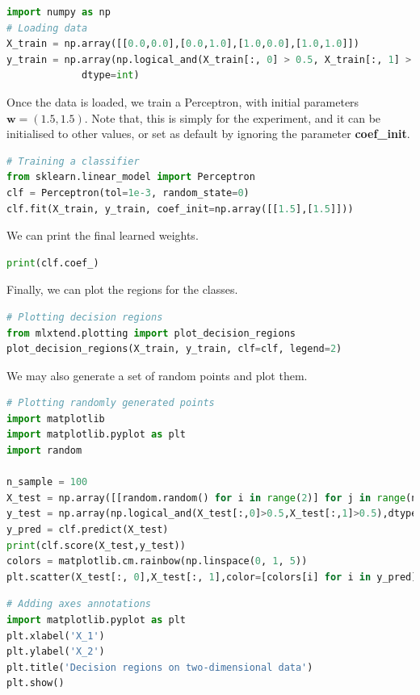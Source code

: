 \begin{lstlisting}[language=Python]
import numpy as np
# Loading data
X_train = np.array([[0.0,0.0],[0.0,1.0],[1.0,0.0],[1.0,1.0]])
y_train = np.array(np.logical_and(X_train[:, 0] > 0.5, X_train[:, 1] > 0.5), 
             dtype=int)
\end{lstlisting}

Once the data is loaded, we train a Perceptron, with initial parameters $\textbf{w}=(1.5,1.5)$. Note that, this is simply for the experiment, and it can be initialised to other values, or set as default by ignoring the parameter \textbf{coef\_init}. 

\begin{lstlisting}[language=Python]
# Training a classifier
from sklearn.linear_model import Perceptron
clf = Perceptron(tol=1e-3, random_state=0)
clf.fit(X_train, y_train, coef_init=np.array([[1.5],[1.5]]))
\end{lstlisting}

We can print the final learned weights. 

\begin{lstlisting}[language=Python]
print(clf.coef_)
\end{lstlisting}

Finally, we can plot the regions for the classes. 

\begin{lstlisting}[language=Python]
# Plotting decision regions
from mlxtend.plotting import plot_decision_regions
plot_decision_regions(X_train, y_train, clf=clf, legend=2)
\end{lstlisting}

We may also generate a set of random points and plot them. 

\begin{lstlisting}[language=Python]
# Plotting randomly generated points 
import matplotlib
import matplotlib.pyplot as plt
import random

n_sample = 100
X_test = np.array([[random.random() for i in range(2)] for j in range(n_sample)])
y_test = np.array(np.logical_and(X_test[:,0]>0.5,X_test[:,1]>0.5),dtype=int)
y_pred = clf.predict(X_test) 
print(clf.score(X_test,y_test))
colors = matplotlib.cm.rainbow(np.linspace(0, 1, 5))
plt.scatter(X_test[:, 0],X_test[:, 1],color=[colors[i] for i in y_pred])
\end{lstlisting}

\begin{lstlisting}[language=Python]
# Adding axes annotations
import matplotlib.pyplot as plt
plt.xlabel('X_1')
plt.ylabel('X_2')
plt.title('Decision regions on two-dimensional data')
plt.show()
\end{lstlisting}
